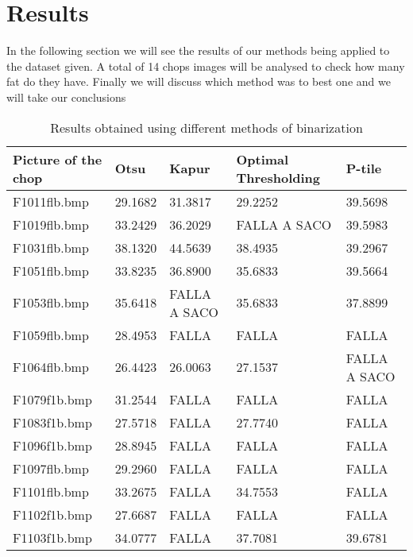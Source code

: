 \documentclass[12]{article}
\begin{document}
\section{Results}
In the following section we will see the results of our methods being applied to the dataset given. A total of 14 chops images will be analysed to check how many fat do they have.  
Finally we will discuss which method was to best one and we will take our conclusions %
\begin{table}[H]
\centering
\begin{tabular}{|l|l|l|l|l|}
\hline	
Picture of the chop & \textbf{Otsu} & \textbf{Kapur} & \textbf{Optimal Thresholding} & \textbf{P-tile} \\  \hline
 F1011flb.bmp & 29.1682  & 31.3817 & 29.2252  & 39.5698  \\ \hline
  F1019flb.bmp & 33.2429 & 36.2029 & FALLA A SACO & 39.5983 \\  \hline
  F1031flb.bmp & 38.1320 & 44.5639 & 38.4935 & 39.2967  \\ \hline
  F1051flb.bmp & 33.8235 & 36.8900 & 35.6833 & 39.5664\\ \hline
F1053flb.bmp & 35.6418 & FALLA A SACO & 35.6833 & 37.8899\\ \hline
F1059flb.bmp & 28.4953 & FALLA & FALLA & FALLA \\ \hline
F1064flb.bmp & 26.4423 & 26.0063 & 27.1537 & FALLA A SACO\\ \hline
F1079f1b.bmp & 31.2544 & FALLA &  FALLA & FALLA \\ \hline
F1083f1b.bmp & 27.5718 & FALLA & 27.7740  & FALLA \\ \hline
F1096f1b.bmp & 28.8945 & FALLA & FALLA & FALLA \\ \hline
F1097flb.bmp & 29.2960 & FALLA & FALLA & FALLA \\ \hline
F1101flb.bmp & 33.2675 & FALLA & 34.7553 & FALLA \\ \hline
F1102f1b.bmp & 27.6687 &FALLA &FALLA	 & FALLA \\ \hline
F1103f1b.bmp  & 34.0777 & FALLA & 37.7081 & 39.6781\\ \hline
\end{tabular}
\caption{Results obtained using different methods of binarization}
\label{Results}
\end{table}
\end{document}
